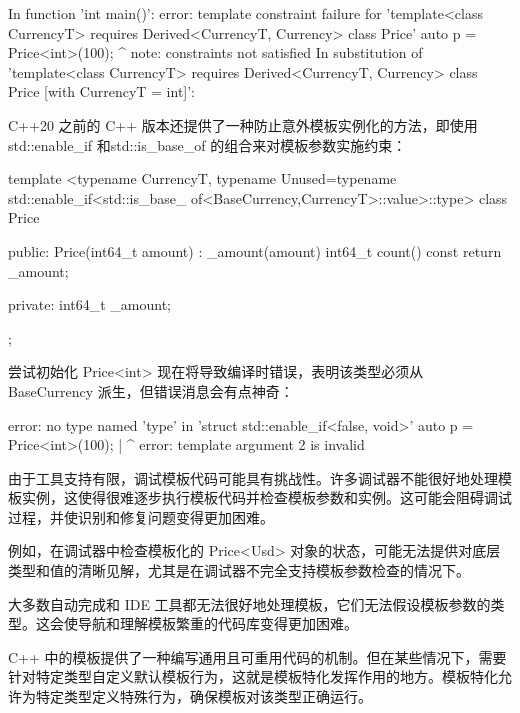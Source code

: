 \begin{shell}
In function 'int main()':
error: template constraint failure for 'template<class
CurrencyT> requires Derived<CurrencyT, Currency> class Price'
auto p = Price<int>(100);
                  ^
note: constraints not satisfied
In substitution of 'template<class
CurrencyT> requires Derived<CurrencyT, Currency> class Price [with
CurrencyT = int]':
\end{shell}

C++20 之前的 C++ 版本还提供了一种防止意外模板实例化的方法，即使用 std::enable\_if 和std::is\_base\_of 的组合来对模板参数实施约束：

\begin{cpp}
template <typename CurrencyT,
          typename Unused=typename std::enable_if<std::is_base_
of<BaseCurrency,CurrencyT>::value>::type>
class Price {
public:
    Price(int64_t amount) : _amount(amount) {}
    int64_t count() const { return _amount; }

private:
    int64_t _amount;
};
\end{cpp}

尝试初始化 Price<int> 现在将导致编译时错误，表明该类型必须从 BaseCurrency 派生，但错误消息会有点神奇：

\begin{shell}
error: no type named 'type' in 'struct std::enable_if<false, void>'
auto p = Price<int>(100);
     |              ^
error: template argument 2 is invalid
\end{shell}


由于工具支持有限，调试模板代码可能具有挑战性。许多调试器不能很好地处理模板实例，这使得很难逐步执行模板代码并检查模板参数和实例。这可能会阻碍调试过程，并使识别和修复问题变得更加困难。

例如，在调试器中检查模板化的 Price<Usd> 对象的状态，可能无法提供对底层类型和值的清晰见解，尤其是在调试器不完全支持模板参数检查的情况下。

大多数自动完成和 IDE 工具都无法很好地处理模板，它们无法假设模板参数的类型。这会使导航和理解模板繁重的代码库变得更加困难。


C++ 中的模板提供了一种编写通用且可重用代码的机制。但在某些情况下，需要针对特定类型自定义默认模板行为，这就是模板特化发挥作用的地方。模板特化允许为特定类型定义特殊行为，确保模板对该类型正确运行。


